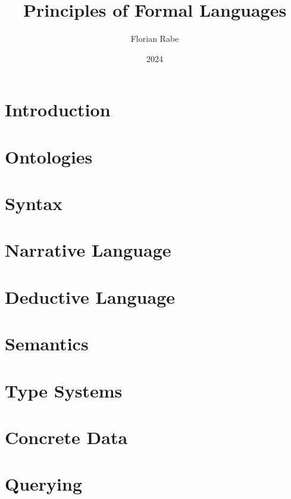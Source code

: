 \documentclass{beamer}
\begin{document}
\title{Principles of Formal Languages}
\author{Florian Rabe}
\date{2024}
\begin{frame}
    \titlepage
\end{frame}

\part{Introduction}


\part{Ontologies}


\part{Syntax}


\part{Narrative Language}


\part{Deductive Language}


\part{Semantics}


\part{Type Systems}


\part{Concrete Data}


\part{Querying}

\end{document}
